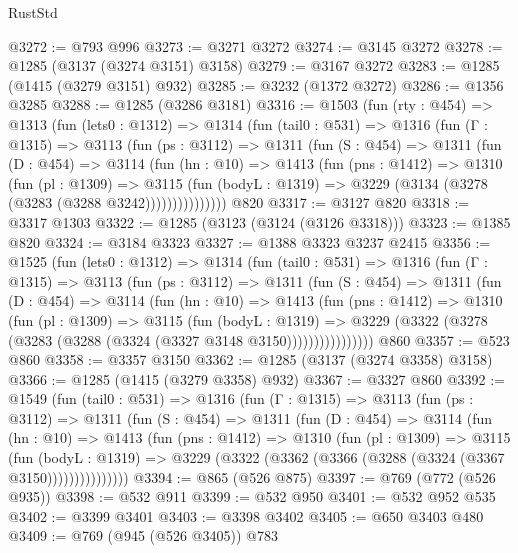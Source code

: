 \begin{lexlean}{RustStd}
\begin{coremodule}
@3272 := @793 @996
@3273 := @3271 @3272
@3274 := @3145 @3272
@3278 := @1285 (@3137 (@3274 @3151) @3158)
@3279 := @3167 @3272
@3283 := @1285 (@1415 (@3279 @3151) @932)
@3285 := @3232 (@1372 @3272)
@3286 := @1356 @3285
@3288 := @1285 (@3286 @3181)
@3316 := @1503
    (fun (rty : @454) =>
    @1313
      (fun (lets0 : @1312) =>
      @1314
        (fun (tail0 : @531) =>
        @1316
          (fun (Γ : @1315) =>
          @3113
            (fun (ps : @3112) =>
            @1311
              (fun (S : @454) =>
              @1311
                (fun (D : @454) =>
                @3114
                  (fun (hn : @10) =>
                  @1413
                    (fun (pns : @1412) =>
                    @1310
                      (fun (pl : @1309) =>
                      @3115
                        (fun (bodyL : @1319) =>
                        @3229 (@3134 (@3278 (@3283 (@3288 @3242)))))))))))))))
    @820
@3317 := @3127 @820
@3318 := @3317 @1303
@3322 := @1285 (@3123 (@3124 (@3126 @3318)))
@3323 := @1385 @820
@3324 := @3184 @3323
@3327 := @1388 @3323 @3237 @2415
@3356 := @1525
    (fun (lets0 : @1312) =>
    @1314
      (fun (tail0 : @531) =>
      @1316
        (fun (Γ : @1315) =>
        @3113
          (fun (ps : @3112) =>
          @1311
            (fun (S : @454) =>
            @1311
              (fun (D : @454) =>
              @3114
                (fun (hn : @10) =>
                @1413
                  (fun (pns : @1412) =>
                  @1310
                    (fun (pl : @1309) =>
                    @3115
                      (fun (bodyL : @1319) =>
                      @3229 (@3322 (@3278 (@3283 (@3288 (@3324 (@3327 @3148 @3150))))))))))))))))
    @860
@3357 := @523 @860
@3358 := @3357 @3150
@3362 := @1285 (@3137 (@3274 @3358) @3158)
@3366 := @1285 (@1415 (@3279 @3358) @932)
@3367 := @3327 @860
@3392 := @1549
    (fun (tail0 : @531) =>
    @1316
      (fun (Γ : @1315) =>
      @3113
        (fun (ps : @3112) =>
        @1311
          (fun (S : @454) =>
          @1311
            (fun (D : @454) =>
            @3114
              (fun (hn : @10) =>
              @1413
                (fun (pns : @1412) =>
                @1310
                  (fun (pl : @1309) =>
                  @3115
                    (fun (bodyL : @1319) =>
                    @3229 (@3322 (@3362 (@3366 (@3288 (@3324 (@3367 @3150)))))))))))))))
@3394 := @865 (@526 @875)
@3397 := @769 (@772 (@526 @935))
@3398 := @532 @911
@3399 := @532 @950
@3401 := @532 @952 @535
@3402 := @3399 @3401
@3403 := @3398 @3402
@3405 := @650 @3403 @480
@3409 := @769 (@945 (@526 @3405)) @783

\end{coremodule}
\end{lexlean}
